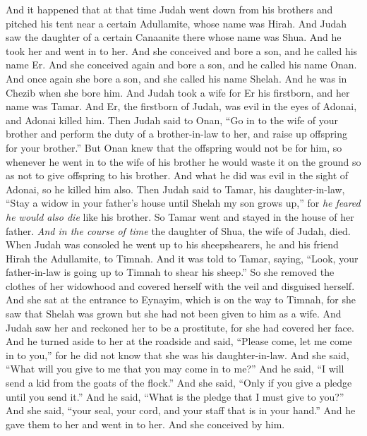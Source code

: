 \begin{biblechapter} %
 And it happened that at that time Judah went down from his brothers and pitched his tent near a certain Adullamite, whose name was Hirah.
\verse And Judah saw the daughter of a certain Canaanite there whose name was Shua. And he took her and went in to her.
\verse And she conceived and bore a son, and he called his name Er.
\verse And she conceived again and bore a son, and he called his name Onan.
\verse And once again she bore a son, and she called his name Shelah. And he was in Chezib when she bore him.
\verse And Judah took a wife for Er his firstborn, and her name was Tamar.
\verse And Er, the firstborn of Judah, was evil in the eyes of Adonai, and Adonai killed him.
\verse Then Judah said to Onan, “Go in to the wife of your brother and perform the duty of a brother-in-law to her, and raise up offspring for your brother.”
\verse But Onan knew that the offspring would not be for him, so whenever he went in to the wife of his brother he would waste it on the ground so as not to give offspring to his brother.
\verse And what he did was evil in the sight of Adonai, so he killed him also.
\verse Then Judah said to Tamar, his daughter-in-law, “Stay a widow in your father’s house until Shelah my son grows up,” for \textit{he feared he would also die} like his brother. So Tamar went and stayed in the house of her father.
\verse \textit{And in the course of time} the daughter of Shua, the wife of Judah, died. When Judah was consoled he went up to his sheepshearers, he and his friend Hirah the Adullamite, to Timnah.
\verse And it was told to Tamar, saying, “Look, your father-in-law is going up to Timnah to shear his sheep.”
\verse So she removed the clothes of her widowhood and covered herself with the veil and disguised herself. And she sat at the entrance to Eynayim, which is on the way to Timnah, for she saw that Shelah was grown but she had not been given to him as a wife.
\verse And Judah saw her and reckoned her to be a prostitute, for she had covered her face.
\verse And he turned aside to her at the roadside and said, “Please come, let me come in to you,” for he did not know that she was his daughter-in-law. And she said, “What will you give to me that you may come in to me?”
\verse And he said, “I will send a kid from the goats of the flock.” And she said, “Only if you give a pledge until you send it.”
\verse And he said, “What is the pledge that I must give to you?” And she said, “your seal, your cord, and your staff that is in your hand.” And he gave them to her and went in to her. And she conceived by him.

\end{biblechapter}
